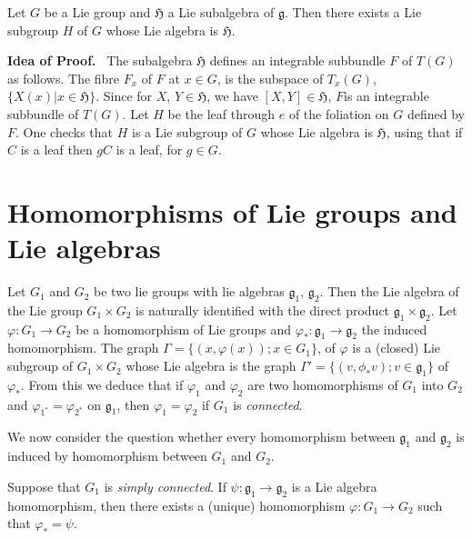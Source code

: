\begin{proposition}\label{chap9-prop9.1}
Let $G$ be a Lie group and $\mathfrak{H}$ a Lie subalgebra of $\mathfrak{g}$. Then there exists a Lie subgroup $H$ of $G$ whose Lie algebra is $\mathfrak{H}$.
\end{proposition}

\noindent
{\bf Idea of Proof.}~ The subalgebra $\mathfrak{H}$ defines an integrable subbundle $F$ of $T(G)$ as follows. The fibre $F_{x}$ of $F$ at $x\in G$, is the subspace of $T_{x}(G)$, $\{X(x)|x\in \mathfrak{H}\}$. Since for $X$, $Y\in \mathfrak{H}$, we have $[X,Y]\in \mathfrak{H}$, $F$\pageoriginale is an integrable subbundle of $T(G)$. Let $H$ be the leaf through $e$ of the foliation on $G$ defined by $F$. One checks that $H$ is a Lie subgroup of $G$ whose Lie algebra is $\mathfrak{H}$, using that if $C$ is a leaf then $gC$ is a leaf, for $g\in G$.

\section*{Homomorphisms of Lie groups and Lie algebras}

Let $G_{1}$ and $G_{2}$ be two lie groups with lie algebras $\mathfrak{g}_{1}$, $\mathfrak{g}_{2}$. Then the Lie algebra of the Lie group $G_{1}\times G_{2}$ is naturally identified with the direct product $\mathfrak{g}_{1}\times \mathfrak{g}_{2}$. Let $\varphi : G_{1}\to G_{2}$ be a homomorphism of Lie groups and $\varphi_{*}:\mathfrak{g}_{1}\to \mathfrak{g}_{2}$ the induced homomorphism. The graph $\Gamma=\{(x,\varphi(x));x\in G_{1}\}$, of $\varphi$ is a (closed) Lie subgroup of $G_{1}\times G_{2}$ whose Lie algebra is the graph $\Gamma'=\{(v,\phi_{*}v);v\in \mathfrak{g}_{1}\}$ of $\varphi_{*}$. From this we deduce that if $\varphi_{1}$ and $\varphi_{2}$ are two homomorphisms of $G_{1}$ into $G_{2}$ and $\varphi_{1^{*}}=\varphi_{2^{*}}$ on $\mathfrak{g}_{1}$, then $\varphi_{1}=\varphi_{2}$ if $G_{1}$ is {\em connected}.

We now consider the question whether every homomorphism between $\mathfrak{g}_{1}$ and $\mathfrak{g}_{2}$ is induced by homomorphism between $G_{1}$ and $G_{2}$.

\begin{proposition}\label{chap9-prop9.2}
Suppose that $G_{1}$ is {\em simply connected}. If $\psi:\mathfrak{g}_{1}\to \mathfrak{g}_{2}$ is a Lie algebra homomorphism, then there exists a (unique) homomorphism $\varphi:G_{1}\to G_{2}$ such that $\varphi_{*}=\psi$.
\end{proposition}

